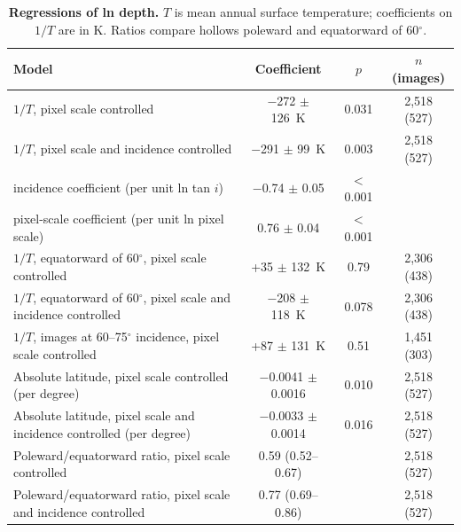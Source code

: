 \documentclass{planetary}
\begin{document}
\begin{table}[!ht]
    \mytablestyle
    \caption{{\bf Regressions of ln depth.} $T$ is mean annual surface temperature; coefficients on $1/T$ are in K. Ratios compare hollows poleward and equatorward of 60$^\circ$.}
    \footnotesize{
        \begin{tabularx}{\textwidth}{>{\raggedright\arraybackslash}X c c c}
            \toprule
            \textbf{Model} & \textbf{Coefficient} & \textbf{$p$} & \textbf{$n$ (images)} \\
            \hline
            $1/T$, pixel scale controlled & $-$272 $\pm$ 126~K & 0.031 & 2,518 (527) \\
            $1/T$, pixel scale and incidence controlled & $-$291 $\pm$ 99~K & 0.003 & 2,518 (527) \\
            \quad incidence coefficient (per unit ln tan $i$) & $-$0.74 $\pm$ 0.05 & $<$ 0.001 & \\
            \quad pixel-scale coefficient (per unit ln pixel scale) & 0.76 $\pm$ 0.04 & $<$ 0.001 & \\
            $1/T$, equatorward of 60$^\circ$, pixel scale controlled & +35 $\pm$ 132~K & 0.79 & 2,306 (438) \\
            $1/T$, equatorward of 60$^\circ$, pixel scale and incidence controlled & $-$208 $\pm$ 118~K & 0.078 & 2,306 (438) \\
            $1/T$, images at 60--75$^\circ$ incidence, pixel scale controlled & +87 $\pm$ 131~K & 0.51 & 1,451 (303) \\
            Absolute latitude, pixel scale controlled (per degree) & $-$0.0041 $\pm$ 0.0016 & 0.010 & 2,518 (527) \\
            Absolute latitude, pixel scale and incidence controlled (per degree) & $-$0.0033 $\pm$ 0.0014 & 0.016 & 2,518 (527) \\
            Poleward/equatorward ratio, pixel scale controlled & 0.59 (0.52--0.67) & & 2,518 (527) \\
            Poleward/equatorward ratio, pixel scale and incidence controlled & 0.77 (0.69--0.86) & & 2,518 (527) \\
            \hline
        \end{tabularx}}
    \label{tab:depthreg}
\end{table}
\end{document}
